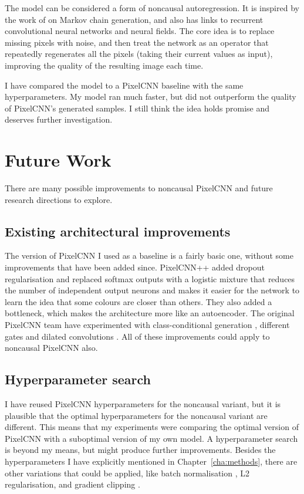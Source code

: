 \documentclass[11pt, a4paper, openany]{book}
\begin{document}
The model can be considered a form of noncausal autoregression. It is inspired by the work of \citet{gsnnade} on Markov chain generation, and also has links to recurrent convolutional neural networks and neural fields. The core idea is to replace missing pixels with noise, and then treat the network as an operator that repeatedly regenerates all the pixels (taking their current values as input), improving the quality of the resulting image each time.

I have compared the model to a PixelCNN baseline with the same hyperparameters. My model ran much faster, but did not outperform the quality of PixelCNN's generated samples. I still think the idea holds promise and deserves further investigation.

\section{Future Work}

There are many possible improvements to noncausal PixelCNN and future research directions to explore.

\subsection{Existing architectural improvements}

The version of PixelCNN I used as a baseline is a fairly basic one, without some improvements that have been added since. PixelCNN++ \citep{pixelcnn++} added dropout regularisation and replaced softmax outputs with a logistic mixture that reduces the number of independent output neurons and makes it easier for the network to learn the idea that some colours are closer than others. They also added a bottleneck, which makes the architecture more like an autoencoder. The original PixelCNN team have experimented with class-conditional generation \citep{pixelcnn2}, different gates \citep{videopixel} and dilated convolutions \citep{wavenet}. All of these improvements could apply to noncausal PixelCNN also.

\subsection{Hyperparameter search}

I have reused PixelCNN hyperparameters for the noncausal variant, but it is plausible that the optimal hyperparameters for the noncausal variant are different. This means that my experiments were comparing the optimal version of PixelCNN with a suboptimal version of my own model. A hyperparameter search is beyond my means, but might produce further improvements. Besides the hyperparameters I have explicitly mentioned in Chapter~\ref{cha:methods}, there are other variations that could be applied, like batch normalisation \citep{batchnormalisation}, L2 regularisation, and gradient clipping \citep{gradientclipping}.
\end{document}
